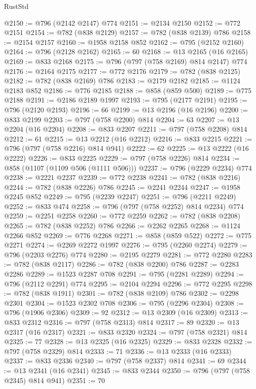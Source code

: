 \begin{lexlean}{RustStd}
\begin{coremodule}
@2150 := @796 (@2142 @2147) @774
@2151 := @2134 @2150
@2152 := @772 @2151
@2154 := @782 (@838 @2129)
@2157 := @782 (@838 @2139) @786
@2158 := @2154 @2157
@2160 := @1958 @2158 @852
@2162 := @795 (@2152 @2160)
@2164 := @796 (@2128 @2162)
@2165 := 60
@2168 := @13 @2165 (@16 @2165)
@2169 := @833 @2168
@2175 := @796 (@797 (@758 @2169) @814 @2147) @774
@2176 := @2164 @2175
@2177 := @772 @2176
@2179 := @782 (@838 @2125)
@2182 := @782 (@838 @2169) @786
@2183 := @2179 @2182
@2185 := @1124 @2183 @852
@2186 := @776 @2185
@2188 := @858 (@859 @500)
@2189 := @775 @2188
@2191 := @2186 @2189 @1997
@2193 := @795 (@2177 @2191)
@2195 := @796 (@2120 @2193)
@2196 := 66
@2199 := @13 @2196 (@16 @2196)
@2200 := @833 @2199
@2203 := @797 (@758 @2200) @814
@2204 := 63
@2207 := @13 @2204 (@16 @2204)
@2208 := @833 @2207
@2211 := @797 (@758 @2208) @814
@2212 := 61
@2215 := @13 @2212 (@16 @2212)
@2216 := @833 @2215
@2221 := @796 (@797 (@758 @2216) @814 @941)
@2222 := 62
@2225 := @13 @2222 (@16 @2222)
@2226 := @833 @2225
@2229 := @797 (@758 @2226) @814
@2234 := @858 (@1107 (@1109 @506 (@1111 @506)))
@2237 := @796 (@2229 @2234) @774
@2238 := @2221 @2237
@2239 := @772 @2238
@2241 := @782 (@838 @2216)
@2244 := @782 (@838 @2226) @786
@2245 := @2241 @2244
@2247 := @1958 @2245 @852
@2249 := @795 (@2239 @2247)
@2251 := @796 (@2211 @2249)
@2252 := @833 @474
@2258 := @796 (@797 (@758 @2252) @814 @2234) @774
@2259 := @2251 @2258
@2260 := @772 @2259
@2262 := @782 (@838 @2208)
@2265 := @782 (@838 @2252) @786
@2266 := @2262 @2265
@2268 := @1124 @2266 @852
@2269 := @776 @2268
@2271 := @858 (@859 @522)
@2272 := @775 @2271
@2274 := @2269 @2272 @1997
@2276 := @795 (@2260 @2274)
@2279 := @796 (@2203 @2276) @774
@2280 := @2195 @2279
@2281 := @772 @2280
@2283 := @782 (@838 @2117)
@2286 := @782 (@838 @2200) @786
@2287 := @2283 @2286
@2289 := @1523 @2287 @708
@2291 := @795 (@2281 @2289)
@2294 := @796 (@2112 @2291) @774
@2295 := @2104 @2294
@2296 := @772 @2295
@2298 := @782 (@838 @1911)
@2301 := @782 (@838 @2109) @786
@2302 := @2298 @2301
@2304 := @1523 @2302 @708
@2306 := @795 (@2296 @2304)
@2308 := @796 (@1906 @2306)
@2309 := 92
@2312 := @13 @2309 (@16 @2309)
@2313 := @833 @2312
@2316 := @797 (@758 @2313) @814
@2317 := 89
@2320 := @13 @2317 (@16 @2317)
@2321 := @833 @2320
@2324 := @797 (@758 @2321) @814
@2325 := 77
@2328 := @13 @2325 (@16 @2325)
@2329 := @833 @2328
@2332 := @797 (@758 @2329) @814
@2333 := 71
@2336 := @13 @2333 (@16 @2333)
@2337 := @833 @2336
@2340 := @797 (@758 @2337) @814
@2341 := 69
@2344 := @13 @2341 (@16 @2341)
@2345 := @833 @2344
@2350 := @796 (@797 (@758 @2345) @814 @941)
@2351 := 70

\end{coremodule}
\end{lexlean}
